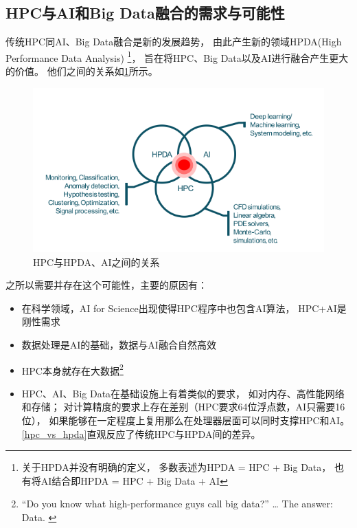\subsection{HPC与AI和Big Data融合的需求与可能性}
传统HPC同AI、Big Data融合是新的发展趋势，
由此产生新的领域HPDA(High Performance Data Analysis)
\footnote{关于HPDA并没有明确的定义，
多数表述为HPDA = HPC + Big Data，
也有将AI结合即HPDA = HPC + Big Data + AI}，
旨在将HPC、Big Data以及AI进行融合产生更大的价值。
他们之间的关系如\cref{hpc_hpda_ai}所示。

\begin{figure}[ht!]
    \centering
    \includegraphics[width=\linewidth]{images/hpc_hpda_ai.png}
    \caption{HPC与HPDA、AI之间的关系}
    \label{hpc_hpda_ai}
\end{figure}

之所以需要并存在这个可能性，主要的原因有\cite{yef2022_hpc}：

\begin{itemize}
    \item 在科学领域，AI for Science出现使得HPC程序中也包含AI算法，
    HPC+AI是刚性需求
    \item 数据处理是AI的基础，数据与AI融合自然高效
    \item HPC本身就存在大数据\footnote{“Do you know what high-performance guys call big data?” … The answer: Data. \cite{hpda_qa}}
    \item HPC、AI、Big Data在基础设施上有着类似的要求，
    如对内存、高性能网络和存储；
    对计算精度的要求上存在差别（HPC要求64位浮点数，AI只需要16位），
    如果能够在一定程度上复用那么在处理器层面可以同时支撑HPC和AI。
    \cref{hpc_vs_hpda}直观反应了传统HPC与HPDA间的差异。
\end{itemize}

